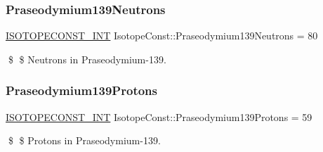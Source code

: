 \subsubsection{\texorpdfstring{Praseodymium139\+Neutrons}{Praseodymium139Neutrons}}
{\footnotesize\ttfamily \mbox{\hyperlink{group___isotope_const-_macros_ga5f18360b3e99483a35c32d789e62621c}{I\+S\+O\+T\+O\+P\+E\+C\+O\+N\+S\+T\+\_\+\+I\+NT}} Isotope\+Const\+::\+Praseodymium139\+Neutrons = 80}

\$ \$ Neutrons in Praseodymium-\/139. \mbox{\label{group___isotope_const-_praseodymium-_pr139_ga65e77beaf64924d90e87d234a78cff5c}} 
\subsubsection{\texorpdfstring{Praseodymium139\+Protons}{Praseodymium139Protons}}
{\footnotesize\ttfamily \mbox{\hyperlink{group___isotope_const-_macros_ga5f18360b3e99483a35c32d789e62621c}{I\+S\+O\+T\+O\+P\+E\+C\+O\+N\+S\+T\+\_\+\+I\+NT}} Isotope\+Const\+::\+Praseodymium139\+Protons = 59}

\$ \$ Protons in Praseodymium-\/139. 